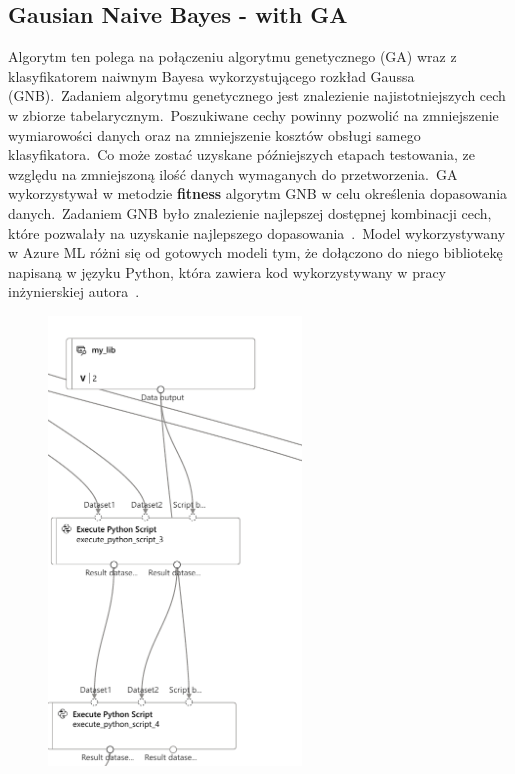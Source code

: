 \subsection{Gausian Naive Bayes - with GA}
Algorytm ten polega na połączeniu algorytmu genetycznego (GA) wraz z klasyfikatorem naiwnym Bayesa wykorzystującego rozkład Gaussa (GNB).\ Zadaniem algorytmu genetycznego jest znalezienie najistotniejszych cech w zbiorze tabelarycznym.\ Poszukiwane cechy powinny pozwolić na zmniejszenie wymiarowości danych oraz na zmniejszenie kosztów obsługi samego klasyfikatora.\ Co może zostać uzyskane późniejszych etapach testowania, ze względu na zmniejszoną ilość danych wymaganych do przetworzenia.\ GA wykorzystywał w metodzie \textbf{fitness} algorytm GNB w celu określenia dopasowania danych.\ Zadaniem GNB było znalezienie najlepszej dostępnej kombinacji cech, które pozwalały na uzyskanie najlepszego dopasowania~\cite{Blyszcz2022}.\ Model wykorzystywany w Azure ML różni się od gotowych modeli tym, że dołączono do niego bibliotekę napisaną w języku Python, która zawiera kod wykorzystywany w pracy inżynierskiej autora~\cite{Suvres2023}.
\begin{figure}[H]
    \centering
    \includegraphics[width=0.6\textwidth]{images/ga_pipe}
    \label{fig:ga-pipe}
\end{figure}

